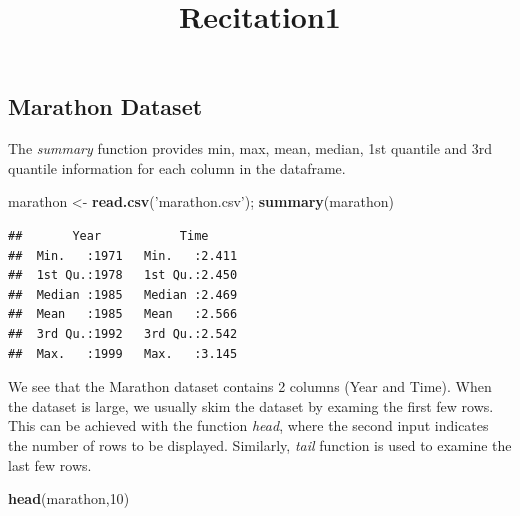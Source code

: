 \documentclass[]{article}
\title{Recitation1}
\author{}
\date{}
\newenvironment{Shaded}{\begin{snugshade}}{\end{snugshade}}
\newcommand{\DataTypeTok}[1]{\textcolor[rgb]{0.13,0.29,0.53}{#1}}
\newcommand{\DecValTok}[1]{\textcolor[rgb]{0.00,0.00,0.81}{#1}}
\newcommand{\KeywordTok}[1]{\textcolor[rgb]{0.13,0.29,0.53}{\textbf{#1}}}
\newcommand{\NormalTok}[1]{#1}
\newcommand{\OperatorTok}[1]{\textcolor[rgb]{0.81,0.36,0.00}{\textbf{#1}}}
\newcommand{\OtherTok}[1]{\textcolor[rgb]{0.56,0.35,0.01}{#1}}
\newcommand{\StringTok}[1]{\textcolor[rgb]{0.31,0.60,0.02}{#1}}
\begin{document}
\maketitle

\begin{Shaded}
\end{Shaded}

\hypertarget{marathon-dataset}{%
\subsection{Marathon Dataset}\label{marathon-dataset}}

The \emph{summary} function provides min, max, mean, median, 1st
quantile and 3rd quantile information for each column in the dataframe.

\begin{Shaded}
\begin{Highlighting}[]
\NormalTok{marathon <-}\StringTok{ }\KeywordTok{read.csv}\NormalTok{(}\StringTok{'marathon.csv'}\NormalTok{);}
\KeywordTok{summary}\NormalTok{(marathon)}
\end{Highlighting}
\end{Shaded}

\begin{verbatim}
##       Year           Time      
##  Min.   :1971   Min.   :2.411  
##  1st Qu.:1978   1st Qu.:2.450  
##  Median :1985   Median :2.469  
##  Mean   :1985   Mean   :2.566  
##  3rd Qu.:1992   3rd Qu.:2.542  
##  Max.   :1999   Max.   :3.145
\end{verbatim}

We see that the Marathon dataset contains 2 columns (Year and Time).
When the dataset is large, we usually skim the dataset by examing the
first few rows. This can be achieved with the function \emph{head},
where the second input indicates the number of rows to be displayed.
Similarly, \emph{tail} function is used to examine the last few rows.

\begin{Shaded}
\begin{Highlighting}[]
\KeywordTok{head}\NormalTok{(marathon,}\DecValTok{10}\NormalTok{)}
\end{Highlighting}
\end{Shaded}
\end{document}
